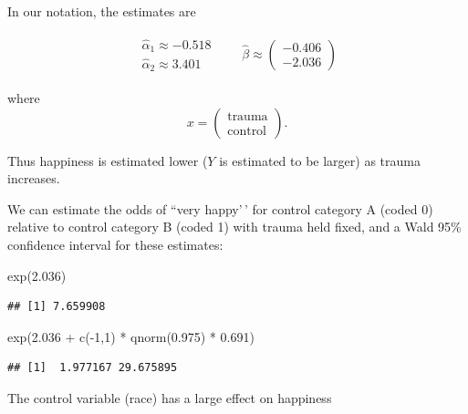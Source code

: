 \documentclass[
  ignorenonframetext,
]{beamer}
\newenvironment{Shaded}{\begin{snugshade}}{\end{snugshade}}
\newcommand{\DecValTok}[1]{\textcolor[rgb]{0.00,0.00,0.81}{#1}}
\newcommand{\FloatTok}[1]{\textcolor[rgb]{0.00,0.00,0.81}{#1}}
\newcommand{\FunctionTok}[1]{\textcolor[rgb]{0.00,0.00,0.00}{#1}}
\newcommand{\NormalTok}[1]{#1}
\newcommand{\SpecialCharTok}[1]{\textcolor[rgb]{0.00,0.00,0.00}{#1}}
\begin{document}
\begin{frame}{}
\protect\hypertarget{section-3}{}
In our notation, the estimates are

\begin{align*}
\begin{array}{c}
  \hat\alpha_1 \approx -0.518 \\
  \hat\alpha_2 \approx 3.401
\end{array} \qquad \hat\beta \approx \left(\begin{array}{c}
  -0.406 \\
  -2.036
\end{array}\right)
\end{align*}

\vspace{12pt}

where \[
  x = \left(\begin{array}{c}
  \text{trauma} \\
  \text{control}
\end{array}\right).
\]
\end{frame}

\begin{frame}[fragile]{}
\protect\hypertarget{section-4}{}
Thus happiness is estimated lower (\(Y\) is estimated to be larger) as
trauma increases.

\vspace{12pt}

We can estimate the odds of ``very happy'\,' for control category A
(coded 0) relative to control category B (coded 1) with trauma held
fixed, and a Wald 95\% confidence interval for these estimates:

\vspace{12pt}
\tiny

\begin{Shaded}
\begin{Highlighting}[]
\FunctionTok{exp}\NormalTok{(}\FloatTok{2.036}\NormalTok{)}
\end{Highlighting}
\end{Shaded}

\begin{verbatim}
## [1] 7.659908
\end{verbatim}

\begin{Shaded}
\begin{Highlighting}[]
\FunctionTok{exp}\NormalTok{(}\FloatTok{2.036} \SpecialCharTok{+} \FunctionTok{c}\NormalTok{(}\SpecialCharTok{{-}}\DecValTok{1}\NormalTok{,}\DecValTok{1}\NormalTok{) }\SpecialCharTok{*} \FunctionTok{qnorm}\NormalTok{(}\FloatTok{0.975}\NormalTok{) }\SpecialCharTok{*} \FloatTok{0.691}\NormalTok{)}
\end{Highlighting}
\end{Shaded}

\begin{verbatim}
## [1]  1.977167 29.675895
\end{verbatim}

\vspace{12pt}
\normalsize

The control variable (race) has a large effect on happiness
\end{frame}
\end{document}
